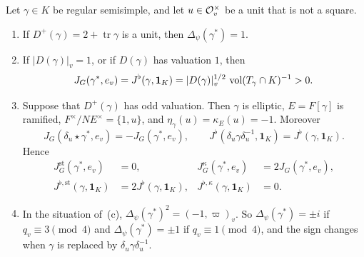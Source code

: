 \begin{proposition}\label{prop:unit-swap}
Let $\gamma\in K$ be regular semisimple, and let $u\in\mathcal{O}_v^\times$ be a
unit that is not a square.
\begin{enumerate}[label=(\alph*)]
\item If $D^+(\gamma)=2+\operatorname{tr}\gamma$ is a unit, then
  $\Delta_\psi(\gamma^*)=1$.
\item If $|D(\gamma)|_v=1$, or if $D(\gamma)$ has valuation $1$, then
  \[
  J_G(\gamma^*,e_v)=J^\flat(\gamma,\mathbf 1_K)=|D(\gamma)|_v^{1/2}\,
  \operatorname{vol}(T_\gamma\cap K)^{-1}>0 .
  \]
\item Suppose that $D^+(\gamma)$ has odd valuation. Then $\gamma$ is
  elliptic, $E=F[\gamma]$ is ramified, $F^\times/N E^\times=\{1,u\}$,
  and $\eta_\gamma(u)=\kappa_E(u)=-1$. Moreover
  \[
  J_G(\delta_u\star\gamma^*,e_v)=-J_G(\gamma^*,e_v),\qquad
  J^\flat(\delta_u\gamma\delta_u^{-1},\mathbf 1_K)=J^\flat(\gamma,\mathbf 1_K).
  \]
  Hence
  \begin{align*}
  J^{\mathrm{st}}_G(\gamma^*,e_v)&=0,&
  J^{\kappa}_G(\gamma^*,e_v)&=2J_G(\gamma^*,e_v),\\
  J^{\flat,\mathrm{st}}(\gamma,\mathbf 1_K)&=2J^\flat(\gamma,\mathbf 1_K),&
  J^{\flat,\kappa}(\gamma,\mathbf 1_K)&=0 .
  \end{align*}
\item In the situation of~(c), $\Delta_\psi(\gamma^*)^2=(-1,\varpi)_v$.
  So $\Delta_\psi(\gamma^*)=\pm i$ if $q_v\equiv3\pmod4$ and
  $\Delta_\psi(\gamma^*)=\pm1$ if $q_v\equiv1\pmod4$, and the sign changes
  when $\gamma$ is replaced by $\delta_u\gamma\delta_u^{-1}$.
\end{enumerate}
\end{proposition}

